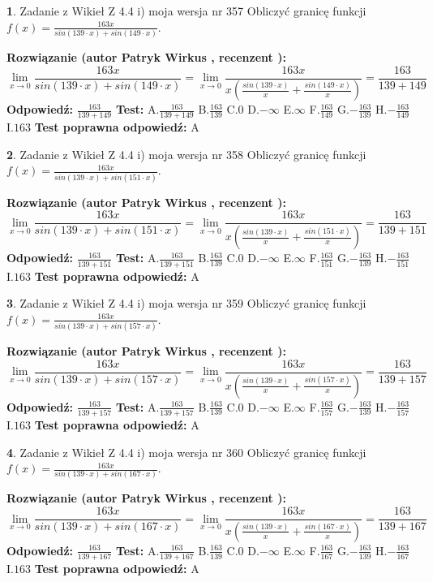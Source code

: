 \documentclass[12pt, a4paper]{article}
\theoremstyle{definition} %
\newtheorem{zad}{}
\newcommand{\zadStart}[1]{\begin{zad}#1\newline}
\newcommand{\zadStop}{\end{zad}}
\newcommand{\rozwStart}[2]{\noindent \textbf{Rozwiązanie (autor #1 , recenzent #2): }\newline}
\newcommand{\rozwStop}{\newline}
\newcommand{\odpStart}{\noindent \textbf{Odpowiedź:}\newline}
\newcommand{\odpStop}{\newline}
\newcommand{\testStart}{\noindent \textbf{Test:}\newline}
\newcommand{\testStop}{\newline}
\newcommand{\kluczStart}{\noindent \textbf{Test poprawna odpowiedź:}\newline}
\newcommand{\kluczStop}{\newline}
\begin{document}
\zadStart{Zadanie z Wikieł Z 4.4 i) moja wersja nr 357}
Obliczyć granicę funkcji $f(x)=\frac{163x}{sin(139\cdot x) +sin(149\cdot x)}$.
\zadStop
\rozwStart{Patryk Wirkus}{}
$$\lim\limits_{x\to 0}\frac{163x}{sin(139\cdot x) +sin(149\cdot x)}=\lim\limits_{x\to 0}\frac{163x}{x(\frac{sin(139\cdot x)}{x}+\frac{sin(149\cdot x)}{x})}=\frac{163}{139+149}$$
\rozwStop
\odpStart
$\frac{163}{139+149}$
\odpStop
\testStart
A.$\frac{163}{139+149}$
B.$\frac{163}{139}$
C.$0$
D.$-\infty$
E.$\infty$
F.$\frac{163}{149}$
G.$-\frac{163}{139}$
H.$-\frac{163}{149}$
I.$163$
\testStop
\kluczStart
A
\kluczStop



\zadStart{Zadanie z Wikieł Z 4.4 i) moja wersja nr 358}
Obliczyć granicę funkcji $f(x)=\frac{163x}{sin(139\cdot x) +sin(151\cdot x)}$.
\zadStop
\rozwStart{Patryk Wirkus}{}
$$\lim\limits_{x\to 0}\frac{163x}{sin(139\cdot x) +sin(151\cdot x)}=\lim\limits_{x\to 0}\frac{163x}{x(\frac{sin(139\cdot x)}{x}+\frac{sin(151\cdot x)}{x})}=\frac{163}{139+151}$$
\rozwStop
\odpStart
$\frac{163}{139+151}$
\odpStop
\testStart
A.$\frac{163}{139+151}$
B.$\frac{163}{139}$
C.$0$
D.$-\infty$
E.$\infty$
F.$\frac{163}{151}$
G.$-\frac{163}{139}$
H.$-\frac{163}{151}$
I.$163$
\testStop
\kluczStart
A
\kluczStop



\zadStart{Zadanie z Wikieł Z 4.4 i) moja wersja nr 359}
Obliczyć granicę funkcji $f(x)=\frac{163x}{sin(139\cdot x) +sin(157\cdot x)}$.
\zadStop
\rozwStart{Patryk Wirkus}{}
$$\lim\limits_{x\to 0}\frac{163x}{sin(139\cdot x) +sin(157\cdot x)}=\lim\limits_{x\to 0}\frac{163x}{x(\frac{sin(139\cdot x)}{x}+\frac{sin(157\cdot x)}{x})}=\frac{163}{139+157}$$
\rozwStop
\odpStart
$\frac{163}{139+157}$
\odpStop
\testStart
A.$\frac{163}{139+157}$
B.$\frac{163}{139}$
C.$0$
D.$-\infty$
E.$\infty$
F.$\frac{163}{157}$
G.$-\frac{163}{139}$
H.$-\frac{163}{157}$
I.$163$
\testStop
\kluczStart
A
\kluczStop



\zadStart{Zadanie z Wikieł Z 4.4 i) moja wersja nr 360}
Obliczyć granicę funkcji $f(x)=\frac{163x}{sin(139\cdot x) +sin(167\cdot x)}$.
\zadStop
\rozwStart{Patryk Wirkus}{}
$$\lim\limits_{x\to 0}\frac{163x}{sin(139\cdot x) +sin(167\cdot x)}=\lim\limits_{x\to 0}\frac{163x}{x(\frac{sin(139\cdot x)}{x}+\frac{sin(167\cdot x)}{x})}=\frac{163}{139+167}$$
\rozwStop
\odpStart
$\frac{163}{139+167}$
\odpStop
\testStart
A.$\frac{163}{139+167}$
B.$\frac{163}{139}$
C.$0$
D.$-\infty$
E.$\infty$
F.$\frac{163}{167}$
G.$-\frac{163}{139}$
H.$-\frac{163}{167}$
I.$163$
\testStop
\kluczStart
A
\kluczStop
\end{document}
